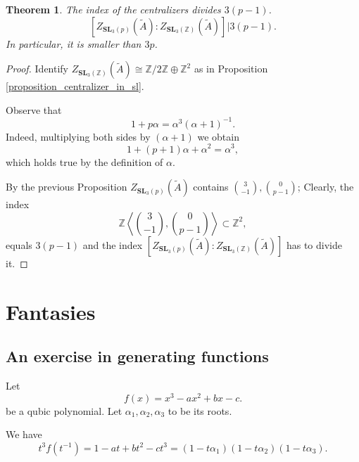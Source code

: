 \documentclass[a4paper]{article}
\newtheorem{Thm}{Theorem}[section]
\newcommand{\SL}{\mathbf{SL}_3(\mathbb{Z})}        %
\newcommand{\SLp}{\mathbf{SL}_3(p)}        %
\begin{document}
\begin{Thm}
	The index of the centralizers divides $3 (p - 1) $. 
\[
	[Z_{\SLp}(\tilde A) : Z_{\SL}(\tilde A)] | 3 (p-1)
.\] 
In particular, it is smaller than $3 p$.
\end{Thm}
\begin{proof}
Identify $Z_{\SL}(\tilde A) \cong \mathbb{Z}/2\mathbb{Z} \oplus \mathbb{Z}^2$ as in Proposition \ref{proposition_centralizer_in_sl}.

Observe that 
\[
1 + p \alpha = \alpha^3 (\alpha + 1)^{-1} 
.\] 
Indeed, multiplying both sides by $(\alpha + 1)$ we obtain
\[
1 + (p + 1) \alpha + \alpha^2 = \alpha^3 
,\] 
which holds true by the definition of $\alpha$.

By the previous Proposition 
$Z_{\SLp}(\tilde A)$ contains $\binom{3}{-1}, \binom{0}{p-1}$;
Clearly, the index
\[
\mathbb{Z} \left< \binom{3}{-1}, \binom{0}{p-1}\right> \subset \mathbb{Z}^2
,\] 
equals $3 (p-1)$ and the index 
$ [Z_{\SLp}(\tilde A) : Z_{\SL}(\tilde A)]$
has to divide it.
\end{proof}


\section{Fantasies}
\subsection{An exercise in generating functions}

Let 
$$
f(x) = x^3 - a x^2 + b x - c
.$$ 
be a qubic polynomial.
Let $\alpha_1, \alpha_2, \alpha_3$ to be its roots.

We have
$$
t^3 f(t^{-1}) = 1 - a t + b t^2 - c t^3 = (1 - t \alpha_1)(1 - t \alpha_2)(1 - t \alpha_3)
.$$ 
\end{document}
